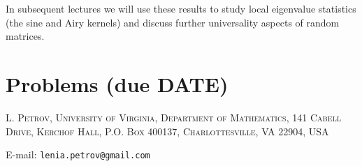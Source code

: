 \documentclass[letterpaper,11pt,oneside,reqno]{article}
\numberwithin{equation}{section}
\theoremstyle{definition}
\begin{document}
In subsequent lectures we will use these results to study local eigenvalue statistics (the sine and Airy kernels) and discuss further universality aspects of random matrices.































\appendix
\setcounter{section}{4}

\section{Problems (due DATE)}









\medskip

\textsc{L. Petrov, University of Virginia, Department of Mathematics, 141 Cabell Drive, Kerchof Hall, P.O. Box 400137, Charlottesville, VA 22904, USA}

E-mail: \texttt{lenia.petrov@gmail.com}
\end{document}
